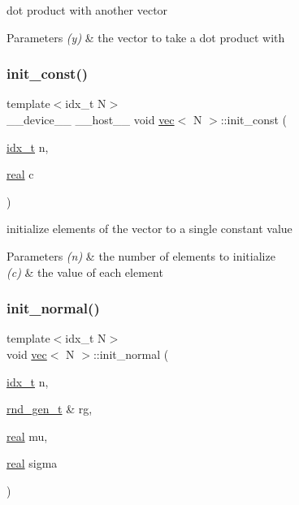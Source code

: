 dot product with another vector 


\begin{DoxyParams}{Parameters}
{\em (y)} & the vector to take a dot product with \\
\hline
\end{DoxyParams}
\mbox{\label{structvec_ac4159809d118cd6c25bae8e17b49360a}} 
\subsubsection{\texorpdfstring{init\+\_\+const()}{init\_const()}}
{\footnotesize\ttfamily template$<$idx\+\_\+t N$>$ \\
\+\_\+\+\_\+device\+\_\+\+\_\+ \+\_\+\+\_\+host\+\_\+\+\_\+ void \hyperlink{structvec}{vec}$<$ N $>$\+::init\+\_\+const (\begin{DoxyParamCaption}\item[{\hyperlink{vgg__util_8h_a8e93478a00e685bea5e6a3f617bf03a3}{idx\+\_\+t}}]{n,  }\item[{\hyperlink{vgg__util_8h_a1082d08aaa761215ec83e7149f27ad16}{real}}]{c }\end{DoxyParamCaption})\hspace{0.3cm}{\ttfamily [inline]}}



initialize elements of the vector to a single constant value 


\begin{DoxyParams}{Parameters}
{\em (n)} & the number of elements to initialize \\
\hline
{\em (c)} & the value of each element \\
\hline
\end{DoxyParams}
\mbox{\label{structvec_a67699ea5f0b7b076b18e4dad7f62c650}} 
\subsubsection{\texorpdfstring{init\+\_\+normal()}{init\_normal()}}
{\footnotesize\ttfamily template$<$idx\+\_\+t N$>$ \\
void \hyperlink{structvec}{vec}$<$ N $>$\+::init\+\_\+normal (\begin{DoxyParamCaption}\item[{\hyperlink{vgg__util_8h_a8e93478a00e685bea5e6a3f617bf03a3}{idx\+\_\+t}}]{n,  }\item[{\hyperlink{structrnd__gen__t}{rnd\+\_\+gen\+\_\+t} \&}]{rg,  }\item[{\hyperlink{vgg__util_8h_a1082d08aaa761215ec83e7149f27ad16}{real}}]{mu,  }\item[{\hyperlink{vgg__util_8h_a1082d08aaa761215ec83e7149f27ad16}{real}}]{sigma }\end{DoxyParamCaption})\hspace{0.3cm}{\ttfamily [inline]}}



